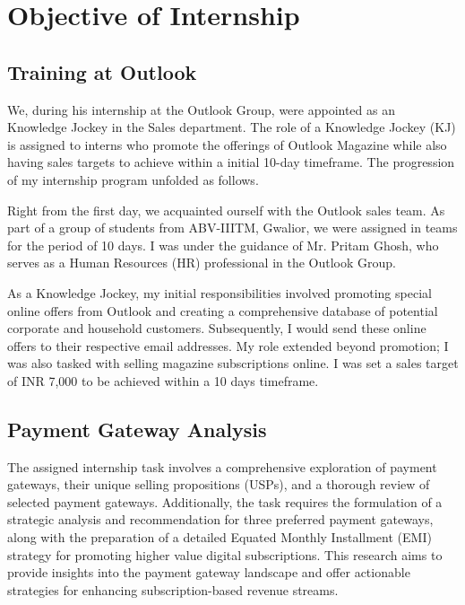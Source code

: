 \section{Objective of Internship}

\subsection*{Training at Outlook}

We, during his internship at the Outlook Group, were appointed as an Knowledge Jockey in the Sales department. The role of a Knowledge Jockey (KJ) is assigned to interns who promote the offerings of Outlook Magazine while also having sales targets to achieve within a initial 10-day timeframe. The progression of my internship program unfolded as follows.

Right from the first day, we acquainted ourself with the Outlook sales team. As part of a group of students from ABV-IIITM, Gwalior, we were assigned in teams for the period of 10 days. I was under the guidance of Mr. Pritam Ghosh, who serves as a Human Resources (HR) professional in the Outlook Group.

As a Knowledge Jockey, my initial responsibilities involved promoting special online offers from Outlook and creating a comprehensive database of potential corporate and household customers. Subsequently, I would send these online offers to their respective email addresses. My role extended beyond promotion; I was also tasked with selling magazine subscriptions online. I was set a sales target of INR 7,000 to be achieved within a 10 days timeframe.

\subsection{Payment Gateway Analysis}

The assigned internship task involves a comprehensive exploration of payment gateways, their unique selling propositions (USPs), and a thorough review of selected payment gateways. Additionally, the task requires the formulation of a strategic analysis and recommendation for three preferred payment gateways, along with the preparation of a detailed Equated Monthly Installment (EMI) strategy for promoting higher value digital subscriptions. This research aims to provide insights into the payment gateway landscape and offer actionable strategies for enhancing subscription-based revenue streams.

